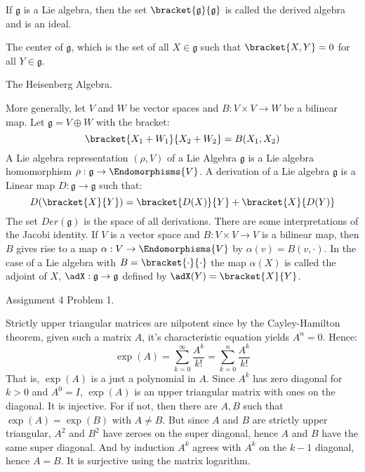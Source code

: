     \begin{example}
        If $\mathfrak{g}$ is a Lie algebra, then the set
        $\bracket{\mathfrak{g}}{\mathfrak{g}}$ is called the derived
        algebra and is an ideal.
    \end{example}
    \begin{example}
        The center of $\mathfrak{g}$, which is the set of all
        $X\in\mathfrak{g}$ such that $\bracket{X,Y}=0$ for all
        $Y\in\mathfrak{g}$.
    \end{example}
    \begin{example}
        The Heisenberg Algebra.
    \end{example}
    More generally, let $V$ and $W$ be vector spaces and
    $B:V\times{V}\rightarrow{W}$ be a bilinear map. Let
    $\mathfrak{g}=V\oplus{W}$ with the bracket:
    \begin{equation}
        \bracket{X_{1}+W_{1}}{X_{2}+W_{2}}=B(X_{1},X_{2})
    \end{equation}
    A Lie algebra representation $(\rho,V)$ of a Lie Algebra
    $\mathfrak{g}$ is a Lie algebra homomorphism
    $\rho:\mathfrak{g}\rightarrow\Endomorphisms{V}$. A derivation of
    a Lie algebra $\mathfrak{g}$ is a Linear map
    $D:\mathfrak{g}\rightarrow\mathfrak{g}$ such that:
    \begin{equation}
        D(\bracket{X}{Y})=\bracket{D(X)}{Y}+\bracket{X}{D(Y)}
    \end{equation}
    The set $Der(\mathfrak{g})$ is the space of all derivations.
    There are some interpretations of the Jacobi identity. If $V$ is
    a vector space and $B:V\times{V}\rightarrow{V}$ is a bilinear
    map, then $B$ gives rise to a map
    $\alpha:V\rightarrow\Endomorphisms{V}$ by
    $\alpha(v)=B(v,\cdot)$. In the case of a Lie algebra with
    $B=\bracket{\cdot}{\cdot}$ the map $\alpha(X)$ is called the
    adjoint of $X$, $\adX:\mathfrak{g}\rightarrow\mathfrak{g}$
    defined by $\adX(Y)=\bracket{X}{Y}$.
    \begin{problem}
        Assignment 4 Problem 1.
    \end{problem}
    \begin{solution}
        Strictly upper triangular matrices are nilpotent since by the
        Cayley-Hamilton theorem, given such a matrix $A$, it's characteristic
        equation yields $A^{n}=0$. Hence:
        \begin{equation}
            \exp(A)=\sum_{k=0}^{\infty}\frac{A^{k}}{k!}
                =\sum_{k=0}^{n}\frac{A^{k}}{k!}
        \end{equation}
        That is, $\exp(A)$ is a just a polynomial in $A$. Since $A^{k}$ has
        zero diagonal for $k>0$ and $A^{0}=I$, $\exp(A)$ is an upper triangular
        matrix with ones on the diagonal. It is injective. For if not, then
        there are $A,B$ such that $\exp(A)=\exp(B)$ with $A\ne{B}$. But since
        $A$ and $B$ are strictly upper triangular, $A^{2}$ and $B^{2}$ have
        zeroes on the super diagonal, hence $A$ and $B$ have the same super
        diagonal. And by induction $A^{k}$ agrees with $A^{k}$ on the
        $k-1$ diagonal, hence $A=B$. It is surjective using the matrix
        logarithm.
    \end{solution}
